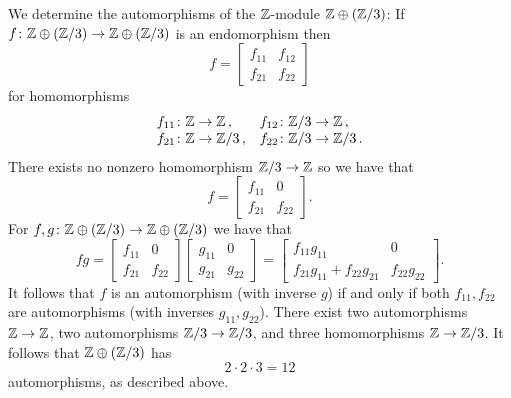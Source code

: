 \begin{example}
  We determine the automorphisms of the $\mathbb{Z}$-module $\mathbb{Z} \oplus (\mathbb{Z}/3)$:
  If $f \colon \mathbb{Z} \oplus (\mathbb{Z}/3) \to \mathbb{Z} \oplus (\mathbb{Z}/3)$ is an endomorphism then
  \[
      f
    = \begin{bmatrix}
        f_{11}  & f_{12}  \\
        f_{21}  & f_{22}
      \end{bmatrix}
  \]
  for homomorphisms
  \[
    \begin{array}{ll}
      f_{11}  \colon  \mathbb{Z}    \to \mathbb{Z} \,,
      &
      f_{12}  \colon  \mathbb{Z}/3  \to \mathbb{Z} \,,
      \\
      f_{21}  \colon  \mathbb{Z}    \to \mathbb{Z}/3 \,,
      &
      f_{22}  \colon  \mathbb{Z}/3  \to \mathbb{Z}/3 \,.
    \end{array}
  \]
  There exists no nonzero homomorphism $\mathbb{Z}/3 \to \mathbb{Z}$ so we have that
  \[
      f
    = \begin{bmatrix}
        f_{11}  & 0       \\
        f_{21}  & f_{22}
      \end{bmatrix}.
  \]
  For $f, g \colon \mathbb{Z} \oplus (\mathbb{Z}/3) \to \mathbb{Z} \oplus (\mathbb{Z}/3)$ we have that
  \[
      fg
    = \begin{bmatrix}
        f_{11}  & 0       \\
        f_{21}  & f_{22}
      \end{bmatrix}
      \begin{bmatrix}
        g_{11}  & 0       \\
        g_{21}  & g_{22}
      \end{bmatrix}
    = \begin{bmatrix}
        f_{11} g_{11}                 & 0             \\
        f_{21} g_{11} + f_{22} g_{21} & f_{22} g_{22}
      \end{bmatrix}.
  \]
  It follows that $f$ is an automorphism (with inverse $g$) if and only if both $f_{11}, f_{22}$ are automorphisms (with inverses $g_{11}, g_{22}$).
  There exist two automorphisms $\mathbb{Z} \to \mathbb{Z}$, two automorphisms $\mathbb{Z}/3 \to \mathbb{Z}/3$, and three homomorphisms $\mathbb{Z} \to \mathbb{Z}/3$.
  It follows that $\mathbb{Z} \oplus (\mathbb{Z}/3)$ has
  \[
      2 \cdot 2 \cdot 3
    = 12
  \]
  automorphisms, as described above.
\end{example}


